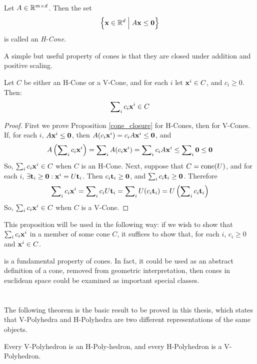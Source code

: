 \drawHPoly

\begin{Def}[H-Cone]{
		Let $A \in \mathbb{R}^{{m}\times d}$. Then the set
		\[ \left\{\mathbf{x} \in \mathbb{R}^d \;\Big|\; A\mathbf{x} \leq \mathbf{0}\right\} \]
		is called an \em{H-Cone}.
	}\end{Def}

\drawHCone

A simple but useful property of cones is that they are closed under addition and positive scaling.

\begin{Prop}\label{cone_closure}
	Let $C$ be either an H-Cone or a V-Cone, and for each $i$ let $\mathbf{x}^i \in C$, and $c_i \geq 0$.  Then:
	\[ \sum\nolimits_i c_i \mathbf{x}^i \in C \]
\end{Prop}

\begin{proof}
	First we prove Proposition \ref{cone_closure} for H-Cones, then for V-Cones.
	If, for each $i$, $A\mathbf{x}^i \leq \mathbf{0}$, then $A(c_i\mathbf{x}^i) = c_iA\mathbf{x}^i \leq \mathbf{0}$, and
	\[ A\left(\sum\nolimits_i c_i\mathbf{x}^i\right) = \sum\nolimits_i A (c_i\mathbf{x}^i) =
		\sum\nolimits_i c_i A\mathbf{x}^i \leq \sum\nolimits_i \mathbf{0} \leq \mathbf{0} \]
	So, $\sum\nolimits_i c_i\mathbf{x}^i \in C$ when $C$ is an H-Cone.  Next, suppose that $C = \operatorname{cone}(U)$, and for each $i$, $\exists \mathbf{t}_i \geq \mathbf{0}: \mathbf{x}^i = U\mathbf{t}_i$.  Then $c_i\mathbf{t}_i \geq \mathbf{0}$, and $\sum\nolimits_i c_i\mathbf{t}_i \geq \mathbf{0}$.  Therefore
	\[ \sum\nolimits_i c_i\mathbf{x}^i = \sum\nolimits_i c_i U\mathbf{t}_i = \sum\nolimits_i U(c_i\mathbf{t}_i)
		= U\left(\sum\nolimits_i c_i\mathbf{t}_i\right) \]
	So, $\sum\nolimits_i c_i\mathbf{x}^i \in C$ when $C$ is a V-Cone.
\end{proof}

This proposition will be used in the following way: if we wish to show that $\sum\nolimits_i c_i\mathbf{x}^i$ in a member of some cone $C$, it suffices to show that, for each $i$, $c_i \geq 0$ and $\mathbf{x}^i \in C$.

\begin{Remark}
 is a fundamental property of cones.  In fact, it could be used as an abstract definition of a cone, removed from geometric interpretation, then cones in euclidean space could be examined as important special classes.
\end{Remark}


\section{\MWT}

The following theorem is the basic result to be proved in this thesis, which states that V-Polyhedra and H-Polyhedra are two different representations of the same objects.

\begin{Thm}[{\MWT}]
		Every V-Polyhedron is an H-Poly-hedron, and every H-Polyhedron is a V-Polyhedron.
\end{Thm}
